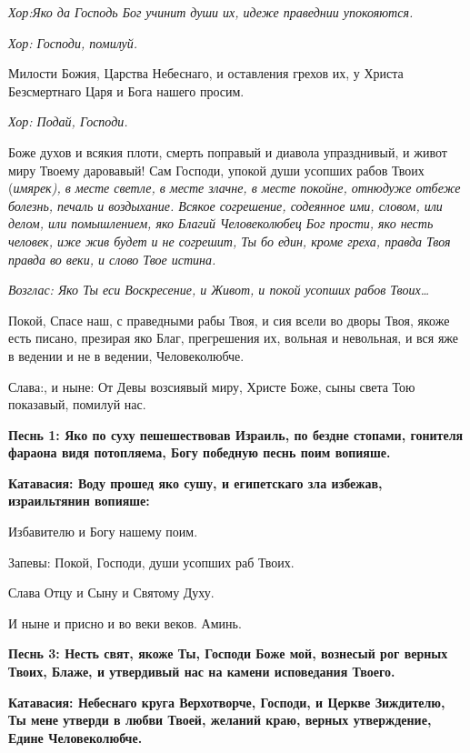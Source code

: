 \itshape Хор:Яко да Господь Бог учинит души их, идеже праведнии упокояются. 

\normalfont{}\itshape Хор:\normalfont{} Господи, помилуй. 

Милости Божия, Царства Небеснаго, и оставления грехов их, у Христа Безсмертнаго Царя и Бога нашего просим. 

\itshape Хор:\normalfont{} Подай, Господи.




Боже духов и всякия плоти, смерть поправый и диавола упразднивый, и живот миру Твоему даровавый! Сам Господи, упокой души усопших рабов Твоих (\itshape имярек\normalfont{}), в месте светле, в месте злачне, в месте покойне, отнюдуже отбеже болезнь, печаль и воздыхание. Всякое согрешение, содеянное ими, словом, или делом, или помышлением, яко Благий Человеколюбец Бог прости, яко несть человек, иже жив будет и не согрешит, Ты бо един, кроме греха, правда Твоя правда во веки, и слово Твое истина. 

\itshape Возглас:\normalfont{} Яко Ты еси Воскресение, и Живот, и покой усопших рабов Твоих…




Покой, Спасе наш, с праведными рабы Твоя, и сия всели во дворы Твоя, якоже есть писано, презирая яко Благ, прегрешения их, вольная и невольная, и вся яже в ведении и не в ведении, Человеколюбче. 

Слава:, и ныне: От Девы возсиявый миру, Христе Боже, сыны света Тою показавый, помилуй нас.




\bfseries Песнь 1:\normalfont{} Яко по суху пешешествовав Израиль, по бездне стопами, гонителя фараона видя потопляема, Богу победную песнь поим вопияше. 

\bfseries Катавасия:\normalfont{} Воду прошед яко сушу, и египетскаго зла избежав, израильтянин вопияше: 

Избавителю и Богу нашему поим. 

Запевы: Покой, Господи, души усопших раб Твоих. 

Слава Отцу и Сыну и Святому Духу. 

И ныне и присно и во веки веков. Аминь.


\bfseries Песнь 3:\normalfont{} Несть свят, якоже Ты, Господи Боже мой, вознесый рог верных Твоих, Блаже, и утвердивый нас на камени исповедания Твоего. 

\bfseries Катавасия:\normalfont{} Небеснаго круга Верхотворче, Господи, и Церкве Зиждителю, Ты мене утверди в любви Твоей, желаний краю, верных утверждение, Едине Человеколюбче. 

